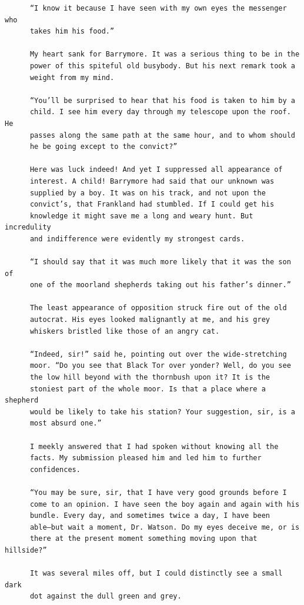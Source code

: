 \documentclass{article}
\begin{document}
\begin{verbatim}
      “I know it because I have seen with my own eyes the messenger who
      takes him his food.”

      My heart sank for Barrymore. It was a serious thing to be in the
      power of this spiteful old busybody. But his next remark took a
      weight from my mind.

      “You’ll be surprised to hear that his food is taken to him by a
      child. I see him every day through my telescope upon the roof. He
      passes along the same path at the same hour, and to whom should
      he be going except to the convict?”

      Here was luck indeed! And yet I suppressed all appearance of
      interest. A child! Barrymore had said that our unknown was
      supplied by a boy. It was on his track, and not upon the
      convict’s, that Frankland had stumbled. If I could get his
      knowledge it might save me a long and weary hunt. But incredulity
      and indifference were evidently my strongest cards.

      “I should say that it was much more likely that it was the son of
      one of the moorland shepherds taking out his father’s dinner.”

      The least appearance of opposition struck fire out of the old
      autocrat. His eyes looked malignantly at me, and his grey
      whiskers bristled like those of an angry cat.

      “Indeed, sir!” said he, pointing out over the wide-stretching
      moor. “Do you see that Black Tor over yonder? Well, do you see
      the low hill beyond with the thornbush upon it? It is the
      stoniest part of the whole moor. Is that a place where a shepherd
      would be likely to take his station? Your suggestion, sir, is a
      most absurd one.”

      I meekly answered that I had spoken without knowing all the
      facts. My submission pleased him and led him to further
      confidences.

      “You may be sure, sir, that I have very good grounds before I
      come to an opinion. I have seen the boy again and again with his
      bundle. Every day, and sometimes twice a day, I have been
      able—but wait a moment, Dr. Watson. Do my eyes deceive me, or is
      there at the present moment something moving upon that hillside?”

      It was several miles off, but I could distinctly see a small dark
      dot against the dull green and grey.


\end{verbatim}
\end{document}

